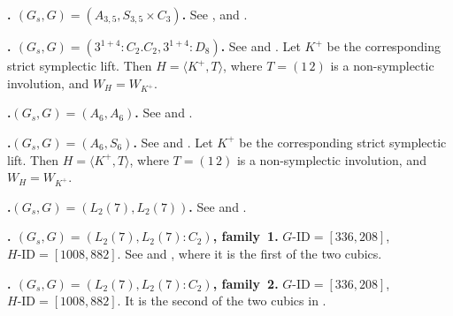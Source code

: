 \documentclass[12pt]{amsart}
\numberwithin{equation}{section}
\theoremstyle{plain}
\theoremstyle{definition}
\theoremstyle{remark}
\begin{document}
\par{}\medskip\noindent\textbf{.\enspace
$(G_s,G)=(A_{3,5},S_{3,5}\times C_3)$.}\label{fam:fourfold-no-8}
See \cite[Theorem~1.8(6)]{laza2022automorphisms}, \cite[\S6.1, (4)]{yang2024automorphism} and
\cite[\S8(v), (8.5)]{KOIKE202512}.

\par{}\medskip\noindent\textbf{.\enspace
$(G_s,G)=(3^{1+4}:C_2.C_2,3^{1+4}:D_8)$.}\label{fam:fourfold-no-9}
See \cite[\S7.1, (7.1)]{KOIKE202512} and
\cite[Proposition~6.1]{FWZ26}.
Let $K^+$ be the corresponding strict symplectic lift.  Then
$H=\langle K^+,T\rangle$, where $T=(1\,2)$ is a non-symplectic
involution, and $W_H=W_{K^+}$.

\par{}\medskip\noindent\textbf{.\enspace $(G_s,G)=(A_6,A_6)$.}\label{fam:fourfold-no-10}
See \cite[\S2.5, (2.9)]{KOIKE202512} and
\cite[\S6.1.2]{FWZ26}.

\par{}\medskip\noindent\textbf{.\enspace $(G_s,G)=(A_6,S_6)$.}\label{fam:fourfold-no-11}
See \cite[\S2.5, (2.6)]{KOIKE202512} and
\cite[\S6.1.1]{FWZ26}.
Let $K^+$ be the corresponding strict symplectic lift.  Then
$H=\langle K^+,T\rangle$, where $T=(1\,2)$ is a non-symplectic
involution, and $W_H=W_{K^+}$.

\par{}\medskip\noindent\textbf{.\enspace $(G_s,G)=(L_2(7),L_2(7))$.}\label{fam:fourfold-no-12}
See \cite[\S7.2, (7.2)]{KOIKE202512} and
\cite[Theorem~1.2(4), \S4.2]{he2025cubicfourfoldsorder7automorphism}.

\par{}\medskip\noindent\textbf{.\enspace
$(G_s,G)=(L_2(7),L_2(7):C_2)$, family~1.}\label{fam:fourfold-no-13}
$G\text{-ID}=[336,208]$, $H\text{-ID}=[1008,882]$.
See
\cite[\S6.1, (13)]{yang2024automorphism} and
\cite[Theorem~1.2(5), \S4.2]{he2025cubicfourfoldsorder7automorphism},
where it is the first of the two cubics.

\par{}\medskip\noindent\textbf{.\enspace
$(G_s,G)=(L_2(7),L_2(7):C_2)$, family~2.}\label{fam:fourfold-no-14}
$G\text{-ID}=[336,208]$, $H\text{-ID}=[1008,882]$.
It is the second of the two cubics in
\cite[Theorem~1.2(5), \S4.2]{he2025cubicfourfoldsorder7automorphism}.
\end{document}
